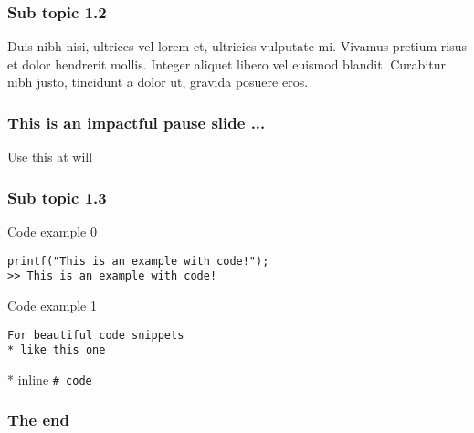 \documentclass[aspectratio=169]{beamer}
\begin{document}
\begin{frame}
\frametitle{Sub topic 1.2}

Duis nibh nisi, ultrices vel lorem et, ultricies vulputate mi. 
Vivamus pretium risus et dolor hendrerit mollis. 
Integer aliquet libero vel euismod blandit. 
Curabitur nibh justo, tincidunt a dolor ut, gravida posuere eros. 

\end{frame}

\begin{frame}
\frametitle{This is an impactful pause slide ...}

Use this at will
\end{frame}

\begin{frame}[fragile]
\frametitle{Sub topic 1.3}

Code example 0

\begin{lstlisting}
printf("This is an example with code!");
>> This is an example with code!
\end{lstlisting}

Code example 1
\begin{verbatim}
For beautiful code snippets
* like this one
\end{verbatim}

* inline \tt{\# code}
\end{frame}

\begin{frame}
\frametitle{The end}
\end{frame}

\frame[plain]{\titlepage}
\end{document}
